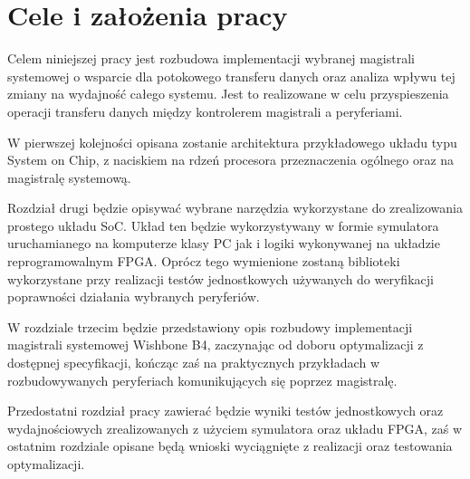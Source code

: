 \section{Cele i założenia pracy}

Celem niniejszej pracy jest rozbudowa implementacji wybranej magistrali systemowej o wsparcie dla potokowego transferu danych oraz analiza wpływu tej zmiany na wydajność całego systemu. Jest to realizowane w celu przyspieszenia operacji transferu danych między kontrolerem magistrali a peryferiami.

W pierwszej kolejności opisana zostanie architektura przykładowego układu typu System on Chip, z naciskiem na rdzeń procesora przeznaczenia ogólnego oraz na magistralę systemową.

Rozdział drugi będzie opisywać wybrane narzędzia wykorzystane do zrealizowania prostego układu SoC. Układ ten będzie wykorzystywany w formie symulatora uruchamianego na komputerze klasy PC jak i logiki wykonywanej na układzie reprogramowalnym FPGA. Oprócz tego wymienione zostaną biblioteki wykorzystane przy realizacji testów jednostkowych używanych do weryfikacji poprawności działania wybranych peryferiów.

W rozdziale trzecim będzie przedstawiony opis rozbudowy implementacji magistrali systemowej Wishbone B4, zaczynając od doboru optymalizacji z dostępnej specyfikacji, kończąc zaś na praktycznych przykładach w rozbudowywanych peryferiach komunikujących się poprzez magistralę.

Przedostatni rozdział pracy zawierać będzie wyniki testów jednostkowych oraz wydajnościowych zrealizowanych z użyciem symulatora oraz układu FPGA, zaś w ostatnim rozdziale opisane będą wnioski wyciągnięte z realizacji oraz testowania optymalizacji.
